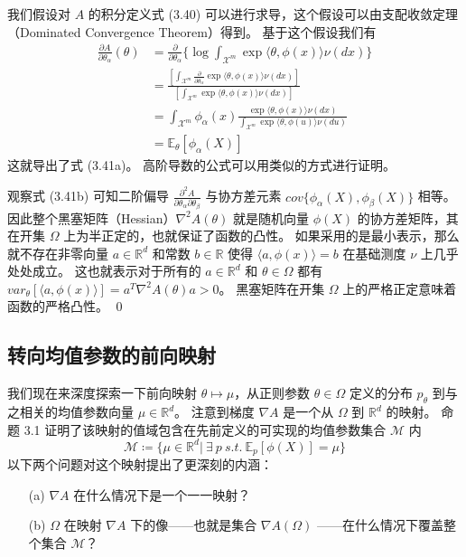 \analysis[证明]
我们假设对 $A$ 的积分定义式 (3.40) 可以进行求导，这个假设可以由支配收敛定理（Dominated Convergence Theorem）得到。
基于这个假设我们有
\begin{align*}
    \frac{\partial A}{\partial \theta_{\alpha}}(\theta) &= \frac{\partial}{\partial \theta_{\alpha}}\{\log\int_{\mathcal{X}^m}\exp\langle\theta, \phi(x)\rangle\nu(dx)\} \\
    &= \frac{[\int_{\mathcal{X}^m}\frac{\partial}{\partial\theta_{\alpha}}\exp\langle\theta, \phi(x)\rangle\nu(dx)]}{[\int_{\mathcal{X}^m}\exp\langle\theta, \phi(x)\rangle\nu(dx)]} \\
    &= \int_{\mathcal{X}^m}\phi_{\alpha}(x)\frac{\exp\langle\theta, \phi(x)\rangle\nu(dx)}{\int_{\mathcal{X}^m}\exp\langle\theta, \phi(u)\rangle\nu(du)} \\
    &= \mathbb{E}_{\theta}[\phi_{\alpha}(X)]
\end{align*}
这就导出了式 (3.41a)。
高阶导数的公式可以用类似的方式进行证明。

观察式 (3.41b) 可知二阶偏导 $\frac{\partial^2A}{\partial\theta_{\alpha}\partial\theta_{\beta}}$ 与协方差元素 $cov\{\phi_{\alpha}(X), \phi_{\beta}(X)\}$ 相等。
因此整个黑塞矩阵（Hessian）$\nabla^2A(\theta)$ 就是随机向量 $\phi(X)$ 的协方差矩阵，其在开集 $\Omega$ 上为半正定的，也就保证了函数的凸性。
如果采用的是最小表示，那么就不存在非零向量 $a \in \mathbb{R}^d$ 和常数 $b \in \mathbb{R}$ 使得 $\langle a, \phi(x)\rangle = b$ 在基础测度 $\nu$ 上几乎处处成立。
这也就表示对于所有的 $a \in \mathbb{R}^d$ 和 $\theta \in \Omega$ 都有 $var_{\theta}[\langle a, \phi(x)\rangle] = a^T\nabla^2A(\theta)a > 0$。
黑塞矩阵在开集 $\Omega$ 上的严格正定意味着函数的严格凸性。
\qed

\subsection{转向均值参数的前向映射}

我们现在来深度探索一下前向映射 $\theta \mapsto \mu$，从正则参数 $\theta \in \Omega$ 定义的分布 $p_{\theta}$ 到与之相关的均值参数向量 $\mu \in \mathbb{R}^d$。
注意到梯度 $\nabla A$ 是一个从 $\Omega$ 到 $\mathbb{R}^d$ 的映射。
命题 3.1 证明了该映射的值域包含在先前定义的可实现的均值参数集合 $\mathcal{M}$ 内
$$\mathcal{M} \coloneqq \{\mu \in \mathbb{R}^d| ~\exists ~p ~s.t. ~\mathbb{E}_p[\phi(X)] = \mu\}$$
以下两个问题对这个映射提出了更深刻的内涵：

\begin{itemize}
    \item[(a)] $\nabla A$ 在什么情况下是一个一一映射？
    \item[(b)] $\Omega$ 在映射 $\nabla A$ 下的像——也就是集合 $\nabla A(\Omega)$ ——在什么情况下覆盖整个集合 $\mathcal{M}$？
\end{itemize}

